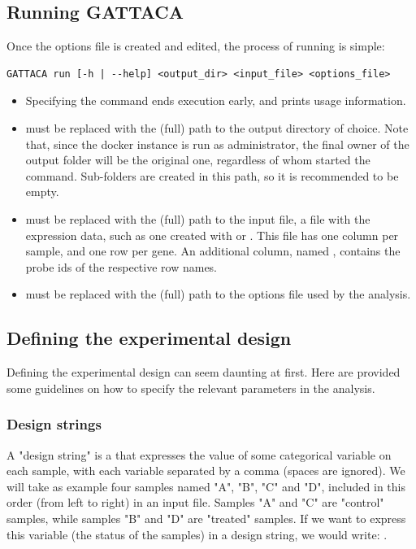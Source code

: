 \subsection{Running GATTACA}
Once the options file is created and edited, the process of running  is simple:
\begin{lstlisting}[style=ShellStyle]
GATTACA run [-h | --help] <output_dir> <input_file> <options_file>
\end{lstlisting}

\begin{itemize}
    \item Specifying the  command ends execution early, and prints usage information.
    \item {} must be replaced with the (full) path to the output directory of choice. Note that, since the docker instance is run as administrator, the final owner of the output folder will be the original one, regardless of whom started the command. Sub-folders are created in this path, so it is recommended to be empty.
    \item {} must be replaced with the (full) path to the input file, a  file with the expression data, such as one created with  or . This file has one column per sample, and one row per gene. An additional column, named , contains the probe ids of the respective row names.
    \item {} must be replaced with the (full) path to the options file used by the analysis.
\end{itemize}

\subsection{Defining the experimental design}
\label{exprdesign}

Defining the experimental design can seem daunting at first. Here are provided some guidelines on how to specify the relevant parameters in the analysis.

\subsubsection{Design strings}
A "design string" is a  that expresses the value of some categorical variable on each sample, with each variable separated by a comma (spaces are ignored). We will take as example four samples named "A", "B", "C" and "D", included in this order (from left to right) in an input file. Samples "A" and "C" are "control" samples, while samples "B" and "D" are "treated" samples. If we want to express this variable (the status of the samples) in a design string, we would write: .

